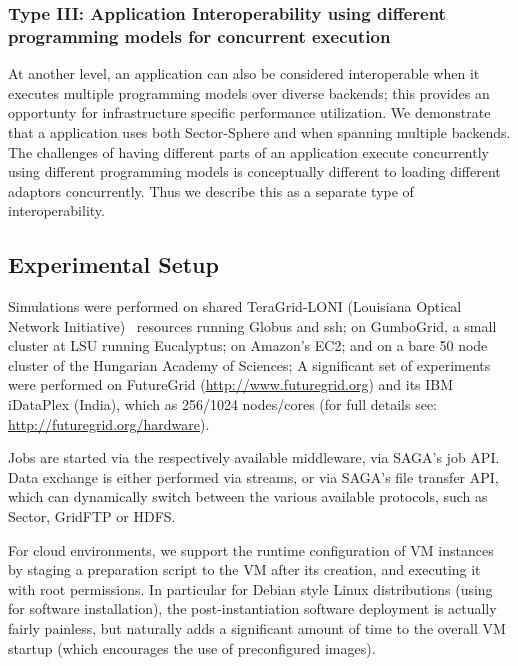 \documentclass[3p,twocolumn]{elsarticle}
\begin{document}
\subsubsection{Type III: Application Interoperability using different
  programming models for concurrent execution}
%
%

At another level, an application can also be considered interoperable
when it executes multiple programming models  over
diverse backends; this provides an opportunty for infrastructure
specific performance utilization.  We demonstrate that a \wc
application uses both Sector-Sphere and \smr when spanning multiple
backends.  The challenges of having different parts of
an application execute concurrently using different programming models
is conceptually different to loading different adaptors concurrently.
Thus we describe this as a separate type of interoperability.

\subsection{Experimental Setup}

Simulations were performed on shared TeraGrid-LONI (Louisiana Optical
Network Initiative)~\cite{loni-url} resources running Globus and ssh;
on GumboGrid, a small cluster at LSU running Eucalyptus; on Amazon's
EC2; and on a bare 50 node cluster of the Hungarian Academy of Sciences;
A significant set of experiments were performed on FutureGrid
(\url{http://www.futuregrid.org}) and its IBM iDataPlex (India), which
as 256/1024 nodes/cores (for full details see:
\url{http://futuregrid.org/hardware}).

Jobs are started via the respectively available middleware, via
SAGA's job API.  Data exchange is either performed via streams, or via
SAGA's file transfer API, which can dynamically switch between the
various available protocols, such as Sector, GridFTP or HDFS.

For cloud environments, we support the runtime configuration of VM
instances by staging a preparation script to the VM after its
creation, and executing it with root permissions.  In particular for
Debian style Linux distributions (using  for software
installation), the
post-instantiation software deployment is actually fairly painless,
but naturally adds a significant amount of time to the overall VM
startup (which encourages the use of preconfigured images).
\end{document}
